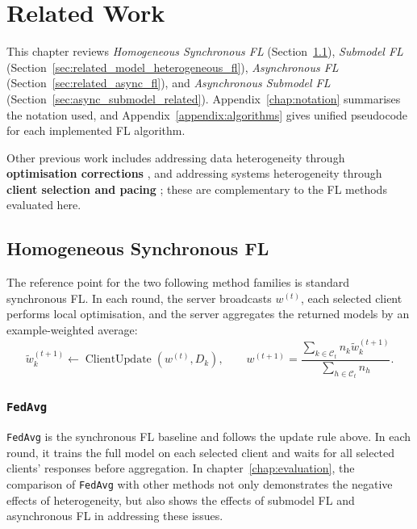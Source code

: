 \chapter{Related Work}
\label{chap:related_work}

This chapter reviews \emph{Homogeneous Synchronous FL} (Section~\ref{sec:related_sync_fl}), \emph{Submodel FL} (Section~\ref{sec:related_model_heterogeneous_fl}), \emph{Asynchronous FL} (Section~\ref{sec:related_async_fl}), and \emph{Asynchronous Submodel FL} (Section~\ref{sec:async_submodel_related}). Appendix~\ref{chap:notation} summarises the notation used, and Appendix~\ref{appendix:algorithms} gives unified pseudocode for each implemented FL algorithm.

Other previous work includes addressing data heterogeneity through \textbf{optimisation corrections} \parencite{li2020fedprox,karimireddy2020scaffold,wang2020fednova}, and addressing systems heterogeneity through \textbf{client selection and pacing} \parencite{nishio2018fedcs,lai2021oort,chai2020tifl}; these are complementary to the FL methods evaluated here.


\section{Homogeneous Synchronous FL}
\label{sec:related_sync_fl}

The reference point for the two following method families is standard synchronous FL. In each round, the server broadcasts \(w^{(t)}\), each selected client performs local optimisation, and the server aggregates the returned models by an example-weighted average:
\[
    \tilde{w}_k^{(t+1)} \leftarrow \operatorname{ClientUpdate}(w^{(t)}, D_k),
    \qquad
    w^{(t+1)}
    =
    \frac{\sum_{k\in\mathcal{C}_t} n_k \tilde{w}_k^{(t+1)}}
         {\sum_{h\in\mathcal{C}_t} n_h}.
\]

\subsection{\texttt{FedAvg}}
\label{sec:fedavg_related}

\texttt{FedAvg} is the synchronous FL baseline \parencite{mcmahan2017fedavg} and follows the update rule above. In each round, it trains the full model on each selected client and waits for all selected clients' responses before aggregation. In chapter~\ref{chap:evaluation}, the comparison of \texttt{FedAvg} with other methods not only demonstrates the negative effects of heterogeneity, but also shows the effects of submodel FL and asynchronous FL in addressing these issues.

